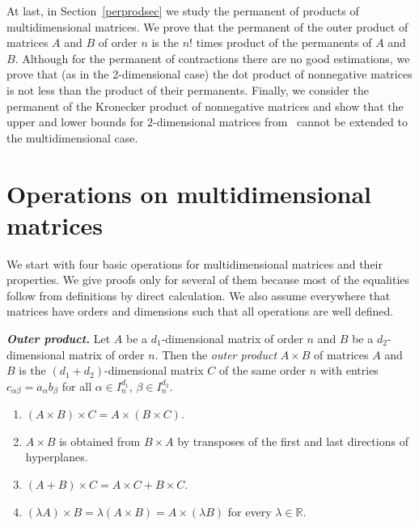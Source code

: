 \documentclass[a4paper]{article}
\begin{document}
At last, in Section~\ref{perprodsec} we study the permanent of products of multidimensional matrices.  We prove that the permanent of the outer product of matrices $A$ and $B$ of order $n$ is the  $n!$ times product of the permanents of $A$ and $B$. Although for the permanent of contractions there are no good estimations, we prove that (as in the 2-dimensional case) the dot product of nonnegative matrices is not less than the product of their permanents. Finally, we consider the permanent of the Kronecker product of nonnegative matrices and show that the upper and lower bounds  for $2$-dimensional matrices from~\cite{brualdi.perdirprod} cannot be extended to the multidimensional case.



\section{Operations on multidimensional matrices} \label{operationsec}

We start with four basic operations for multidimensional matrices and their properties. We give proofs only for several of them  because most of the equalities follow   from  definitions by direct calculation.  We also assume everywhere that  matrices have  orders and dimensions such that all operations are well defined. 


\textbf{\textit{Outer product.}}
Let $A$ be a $d_1$-dimensional matrix of order $n$ and $B$  be a $d_2$-dimensional matrix of order $n$.  Then the \textit{outer product} $A\times B$ of matrices $A$ and $B$ is the $(d_1 + d_2)$-dimensional matrix $C$ of the same order $n$ with entries $c_{\alpha \beta} = a_\alpha b_\beta$ for all $\alpha \in I_n^{d_1}$, $\beta \in I_{n}^{d_2}$. 


\begin{utv} \label{outerprop}
\item
\begin{enumerate}
\item $(A \times B) \times C = A \times (B \times C)$.
\item $A \times B$  is obtained from $B \times A$ by transposes of the first and last directions of hyperplanes.
\item $(A + B) \times C = A \times C + B \times C$.
\item $(\lambda A) \times B = \lambda (A \times B) = A \times (\lambda B)$ for every $\lambda \in \mathbb{R}$.
\end{enumerate}
\end{utv}
\end{document}
